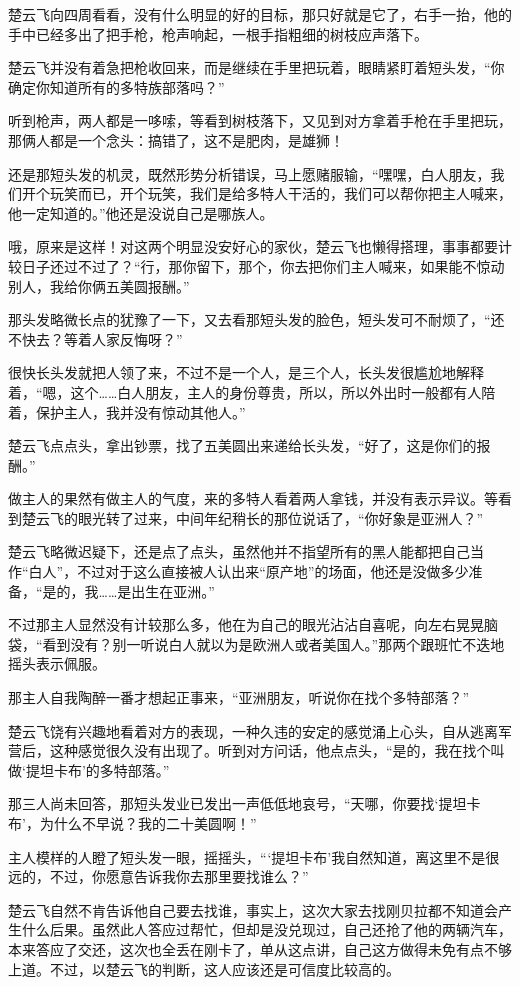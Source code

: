 楚云飞向四周看看，没有什么明显的好的目标，那只好就是它了，右手一抬，他的手中已经多出了把手枪，枪声响起，一根手指粗细的树枝应声落下。

楚云飞并没有着急把枪收回来，而是继续在手里把玩着，眼睛紧盯着短头发，“你确定你知道所有的多特族部落吗？”

听到枪声，两人都是一哆嗦，等看到树枝落下，又见到对方拿着手枪在手里把玩，那俩人都是一个念头：搞错了，这不是肥肉，是雄狮！

还是那短头发的机灵，既然形势分析错误，马上愿赌服输，“嘿嘿，白人朋友，我们开个玩笑而已，开个玩笑，我们是给多特人干活的，我们可以帮你把主人喊来，他一定知道的。”他还是没说自己是哪族人。

哦，原来是这样！对这两个明显没安好心的家伙，楚云飞也懒得搭理，事事都要计较日子还过不过了？“行，那你留下，那个，你去把你们主人喊来，如果能不惊动别人，我给你俩五美圆报酬。”

那头发略微长点的犹豫了一下，又去看那短头发的脸色，短头发可不耐烦了，“还不快去？等着人家反悔呀？”

很快长头发就把人领了来，不过不是一个人，是三个人，长头发很尴尬地解释着，“嗯，这个……白人朋友，主人的身份尊贵，所以，所以外出时一般都有人陪着，保护主人，我并没有惊动其他人。”

楚云飞点点头，拿出钞票，找了五美圆出来递给长头发，“好了，这是你们的报酬。”

做主人的果然有做主人的气度，来的多特人看着两人拿钱，并没有表示异议。等看到楚云飞的眼光转了过来，中间年纪稍长的那位说话了，“你好象是亚洲人？”

楚云飞略微迟疑下，还是点了点头，虽然他并不指望所有的黑人能都把自己当作“白人”，不过对于这么直接被人认出来“原产地”的场面，他还是没做多少准备，“是的，我……是出生在亚洲。”

不过那主人显然没有计较那么多，他在为自己的眼光沾沾自喜呢，向左右晃晃脑袋，“看到没有？别一听说白人就以为是欧洲人或者美国人。”那两个跟班忙不迭地摇头表示佩服。

那主人自我陶醉一番才想起正事来，“亚洲朋友，听说你在找个多特部落？”

楚云飞饶有兴趣地看着对方的表现，一种久违的安定的感觉涌上心头，自从逃离军营后，这种感觉很久没有出现了。听到对方问话，他点点头，“是的，我在找个叫做‘提坦卡布’的多特部落。”

那三人尚未回答，那短头发业已发出一声低低地哀号，“天哪，你要找‘提坦卡布’，为什么不早说？我的二十美圆啊！”

主人模样的人瞪了短头发一眼，摇摇头，“‘提坦卡布’我自然知道，离这里不是很远的，不过，你愿意告诉我你去那里要找谁么？”

楚云飞自然不肯告诉他自己要去找谁，事实上，这次大家去找刚贝拉都不知道会产生什么后果。虽然此人答应过帮忙，但却是没兑现过，自己还抢了他的两辆汽车，本来答应了交还，这次也全丢在刚卡了，单从这点讲，自己这方做得未免有点不够上道。不过，以楚云飞的判断，这人应该还是可信度比较高的。

